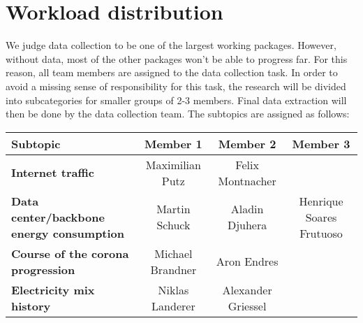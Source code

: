 \documentclass[s=english,inputenc=utf8,fontsize=10pt]{ldvarticle}
\begin{document}
\section{Workload distribution}

We judge data collection to be one of the largest working packages. However, without data, most of the other packages won't be able to progress far. For this reason, all team members are assigned to the data collection task. In order to avoid a missing sense of responsibility for this task, the research will be divided into subcategories for smaller groups of 2-3 members. Final data extraction will then be done by the data collection team.
The subtopics are assigned as follows:
\begin{table}[h]
	\begin{center}
		\begin{tabular}{l|ccc} %
			\textbf{Subtopic} & Member 1 & Member 2 & Member 3\\
			\hline
			\textbf{Internet traffic} & Maximilian Putz & Felix Montnacher &\\
			\textbf{Data center/backbone energy consumption} & Martin Schuck & Aladin Djuhera & Henrique Soares Frutuoso\\
			\textbf{Course of the corona progression} & Michael Brandner & Aron Endres &\\
			\textbf{Electricity mix history} & Niklas Landerer & Alexander Griessel &\\
		\end{tabular}
	\end{center}
\end{table}
\end{document}
